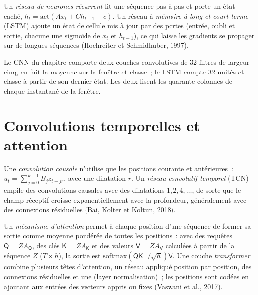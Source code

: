 \begin{definition}\label{def:ml:sequence-models-on-order-books:rnn}
Un \emph{réseau de neurones récurrent} lit une séquence pas à pas et porte un état caché,
$h_t = \mathrm{act}(A x_t + C h_{t-1} + c)$. Un réseau à \emph{mémoire à long et court terme}
(LSTM) ajoute un état de cellule mis à jour par des portes (entrée, oubli et sortie, chacune une sigmoïde de $x_t$ et $h_{t-1}$), ce qui
laisse les gradients se propager sur de longues séquences (Hochreiter et Schmidhuber, 1997).
\end{definition}

Le CNN du chapitre comporte deux couches convolutives de 32 filtres de largeur cinq, en fait la moyenne sur la fenêtre et classe~;
le LSTM compte 32 unités et classe à partir de son dernier état. Les deux lisent les quarante colonnes de chaque instantané de la fenêtre.

\section{Convolutions temporelles et attention}

\begin{definition}\label{def:ml:sequence-models-on-order-books:tcn}
Une \emph{convolution causale} n'utilise que les positions courante et antérieures~:
$u_t = \sum_{j=0}^{k-1}B_jz_{t - jr}$, avec une dilatation $r$. Un
\emph{réseau convolutif temporel} (TCN) empile des convolutions causales avec des dilatations $1, 2, 4,\dots$, de sorte que le champ réceptif croisse
exponentiellement avec la profondeur, généralement avec des connexions résiduelles (Bai, Kolter et Koltun, 2018).
\end{definition}

\begin{definition}\label{def:ml:sequence-models-on-order-books:attention}
Un \emph{mécanisme d'attention} permet à chaque position d'une séquence de former sa sortie comme
moyenne pondérée de toutes les positions~: avec des requêtes $\mathsf Q = ZA_{\mathsf Q}$, des clés $\mathsf K = ZA_{\mathsf K}$ et des valeurs
$\mathsf V = ZA_{\mathsf V}$ calculées à partir de la séquence $Z$ ($T\times h$), la sortie est
$\mathrm{softmax}(\mathsf Q\mathsf K^\top/\sqrt h)\mathsf V$. Une couche \emph{transformer} combine
plusieurs têtes d'attention, un réseau appliqué position par position, des connexions résiduelles et une  (layer normalisation)~; les positions sont codées
en ajoutant aux entrées des vecteurs appris ou fixes (Vaswani et al., 2017).
\end{definition}

